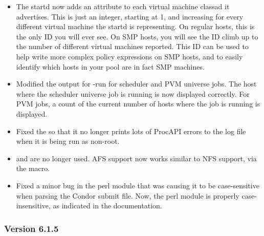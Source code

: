 \begin{itemize}
\item The startd now adds an  attribute to
each virtual machine classad it advertises.
This is just an integer, starting at 1, and increasing for every
different virtual machine the startd is representing.
On regular hosts, this is the only ID you will ever see.
On SMP hosts, you will see the ID climb up to the number of different
virtual machines reported.
This ID can be used to help write more complex policy expressions on
SMP hosts, and to easily identify which hosts in your pool are in fact
SMP machines.

\item Modified the output for  -run for scheduler and PVM
universe jobs.  The host where the scheduler universe job is running
is now displayed correctly.  For PVM jobs, a count of the current
number of hosts where the job is running is displayed.

\item Fixed the  so that it no longer prints lots of
ProcAPI errors to the log file when it is being run as non-root.

\item {} and  are no longer
used.  AFS support now works similar to NFS support, via the
 macro.

\item Fixed a minor bug in the  perl module that was
causing it to be case-sensitive when parsing the Condor submit file.
Now, the perl module is properly case-insensitive, as indicated in the
documentation.

\end{itemize}

\subsubsection{\label{sec:New-6-1-5}Version 6.1.5}

